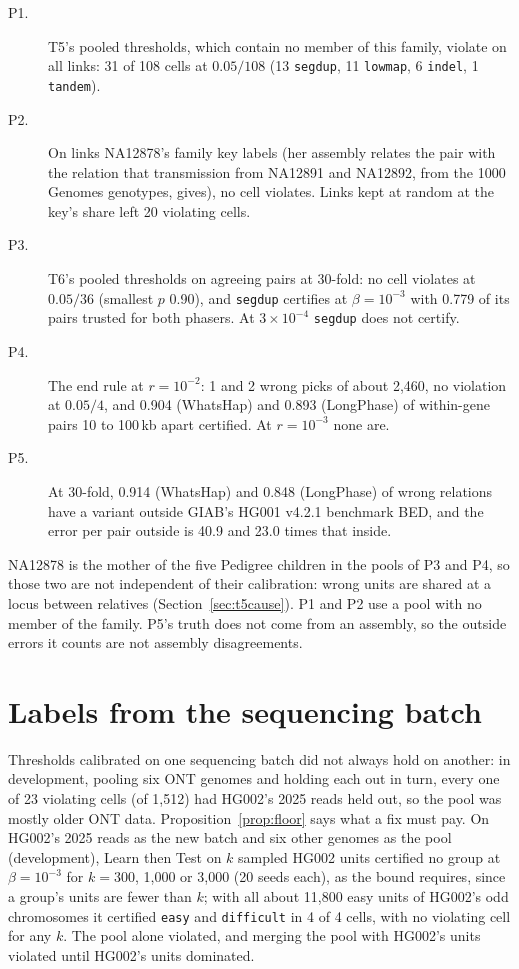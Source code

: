 \documentclass[11pt]{article}
\theoremstyle{definition}
\theoremstyle{remark}
\begin{document}
\begin{description}
\item[P1.] T5's pooled thresholds, which contain no member of this family,
  violate on all links: 31 of 108 cells at $0.05/108$ (13 \texttt{segdup},
  11 \texttt{lowmap}, 6 \texttt{indel}, 1 \texttt{tandem}).
\item[P2.] On links NA12878's family key labels (her assembly relates the
  pair with the relation that transmission from NA12891 and NA12892, from
  the 1000 Genomes genotypes, gives), no cell violates. Links kept at random
  at the key's share left 20 violating cells.
\item[P3.] T6's pooled thresholds on agreeing pairs at 30-fold: no cell
  violates at $0.05/36$ (smallest $p$ 0.90), and \texttt{segdup} certifies
  at $\beta=10^{-3}$ with 0.779 of its pairs trusted for both phasers. At
  $3\times10^{-4}$ \texttt{segdup} does not certify.
\item[P4.] The end rule at $r=10^{-2}$: 1 and 2 wrong picks of about
  2{,}460, no violation at $0.05/4$, and 0.904 (WhatsHap) and 0.893
  (LongPhase) of within-gene pairs 10 to 100\,kb apart certified. At
  $r=10^{-3}$ none are.
\item[P5.] At 30-fold, 0.914 (WhatsHap) and 0.848 (LongPhase) of wrong
  relations have a variant outside GIAB's HG001 v4.2.1 benchmark BED, and
  the error per pair outside is 40.9 and 23.0 times that inside.
\end{description}

NA12878 is the mother of the five Pedigree children in the pools of P3 and
P4, so those two are not independent of their calibration: wrong units are
shared at a locus between relatives (Section~\ref{sec:t5cause}). P1 and P2
use a pool with no member of the family. P5's truth does not come from an
assembly, so the outside errors it counts are not assembly disagreements.

\section{Labels from the sequencing batch}\label{sec:labels}

Thresholds calibrated on one sequencing batch did not always hold on
another: in development, pooling six ONT genomes and holding each out in
turn, every one of 23 violating cells (of 1{,}512) had HG002's 2025 reads held
out, so the pool was mostly older ONT data. Proposition~\ref{prop:floor}
says what a fix must pay. On HG002's 2025 reads as the new batch and six
other genomes as the pool (development), Learn then Test on $k$ sampled
HG002 units certified no group at $\beta=10^{-3}$ for $k=300$, 1{,}000 or
3{,}000 (20 seeds each), as the bound requires, since a group's units are
fewer than $k$; with all about 11{,}800 easy units of HG002's odd chromosomes
it certified \texttt{easy} and \texttt{difficult} in 4 of 4 cells, with no
violating cell for any $k$. The pool alone violated, and merging the pool
with HG002's units violated until HG002's units dominated.
\end{document}
